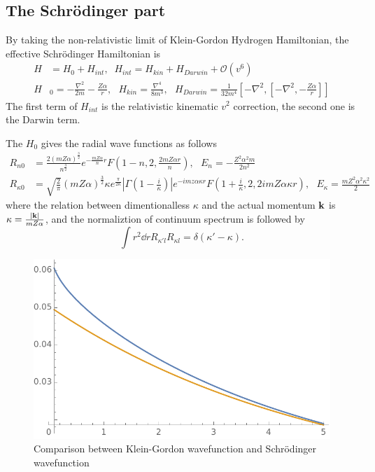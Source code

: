 \documentclass[aps,prd,preprint,showkeys,10pt]{revtex4-1}
\newcommand{\vbk}{\vb{k}}
\renewcommand{\a}{\alpha}
\newcommand{\ka}{\kappa}
\begin{document}
\subsection{The Schr\"odinger part}

By taking the non-relativistic limit of Klein-Gordon Hydrogen Hamiltonian, the effective Schr\"odinger Hamiltonian is\cite{Holstein2014}
\begin{align}
	H & =H_0+H_{int} ,\;\;H_{int}=H_{kin}+H_{Darwin}+\mathcal{O}(v^6)                                                                                            \\
	H & _0=-\frac{\nabla^2}{2m}-\frac{Z\alpha}{r},\ \ \ H_{kin}=\frac{\nabla^4}{8m^3},\ \ \ H_{Darwin}=\frac{1}{32m^4}[-\nabla^2,[-\nabla^2,-\frac{Z\alpha}{r}]]
\end{align}
The first term of $H_{int}$ is the relativistic kinematic $v^2$ correction, the second one is the Darwin term.

The $H_0$ gives the radial wave functions as follows
\begin{align}
	R_{n0}       & =\frac{2(mZ\alpha)^\frac{3}{2}}{n^\frac{3}{2}}e^{-\frac{mZ\alpha}{n}r}F(1-n,2,\frac{2mZ\alpha r}{n}),\ \ \ E_n=-\frac{Z^2\alpha^2m}{2n^2}                                                                             \\
	R_{\kappa 0} & =\sqrt{\frac{2}{\pi}}(mZ\alpha)^\frac{3}{2}\kappa e^\frac{\pi}{2\kappa}|\Gamma(1-\frac{i}{\kappa})|e^{-imz\alpha \kappa r}F(1+\frac{i}{\kappa},2,2imZ\alpha \kappa r),\ \ \ E_{\kappa}=\frac{mZ^2\alpha^2\kappa^2}{2}
\end{align}
where the relation between dimentionalless $\ka$ and the actual momentum $\vbk$ is $\kappa=\frac{\abs{\vbk}}{m Z \a}$, and the normaliztion of continuum spectrum is followed by $$\int r^2\dd rR_{\ka' l}R_{\ka l}=\delta(\ka'-\ka).$$
\begin{figure}
	\centering
	\includegraphics[width=4 in]{QM-KG-1.pdf}
	\caption{Comparison between Klein-Gordon wavefunction and Schr\"odinger wavefunction}
\end{figure}
\end{document}
